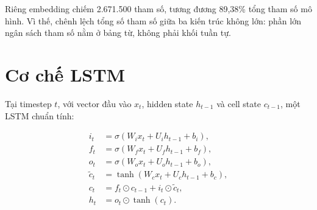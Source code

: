 \documentclass[12pt]{report}
\begin{document}
\begin{table}[H]
\centering
\caption{Chi tiết từng lớp của mô hình chính}
\label{tab:bilstm-layers}
\end{table}

Riêng embedding chiếm 2.671.500 tham số, tương đương 89,38\% tổng tham số mô
hình. Vì thế, chênh lệch tổng số tham số giữa ba kiến trúc không lớn: phần lớn
ngân sách tham số nằm ở bảng từ, không phải khối tuần tự.

\section{Cơ chế LSTM}

Tại timestep $t$, với vector đầu vào $x_t$, hidden state $h_{t-1}$ và cell state
$c_{t-1}$, một LSTM chuẩn tính:

\begin{align}
i_t &= \sigma(W_i x_t + U_i h_{t-1} + b_i),\\
f_t &= \sigma(W_f x_t + U_f h_{t-1} + b_f),\\
o_t &= \sigma(W_o x_t + U_o h_{t-1} + b_o),\\
\tilde{c}_t &= \tanh(W_c x_t + U_c h_{t-1} + b_c),\\
c_t &= f_t \odot c_{t-1} + i_t \odot \tilde{c}_t,\\
h_t &= o_t \odot \tanh(c_t).
\end{align}
\end{document}
